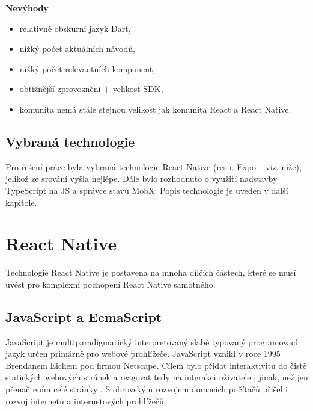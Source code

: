 \textbf{Nevýhody}
\begin{itemize}
	\item relativně obskurní jazyk Dart,
	\item nížký počet aktuálních návodů,
	\item nížký počet relevantních komponent,
	\item obtížnější zprovoznění + velikost SDK,
	\item komunita nemá stále stejnou velikost jak komunita React a React Native.
\end{itemize}

\subsection{Vybraná technologie}

Pro řešení práce byla vybraná technologie React Native (resp. Expo -- viz. níže), jelikož ze srování vyšla nejlépe. Dále bylo rozhodnuto o využití nadstavby TypeScript na JS a správce stavů MobX. Popis technologie je uveden v další kapitole.

\section{React Native}

Technologie React Native je postavena na mnoha dílčích částech, které se musí uvést pro komplexní pochopení React Native samotného.

\subsection{JavaScript a EcmaScript}


JavaScript je multiparadigmatický interpretovaný slabě typovaný programovací jazyk určen primárně pro webové prohlížeče. JavaScript vznikl v roce 1995 Brendanem Eichem pod firmou Netscape. Cílem bylo přidat interaktivitu do čistě statických webových stránek a reagovat tedy na interakci uživatele i jinak, než jen přenačtením celé stránky \cite{Hamilton2008}. S obrovským rozvojem domacích počítačů přišel i rozvoj internetu a internetových prohlížečů.

